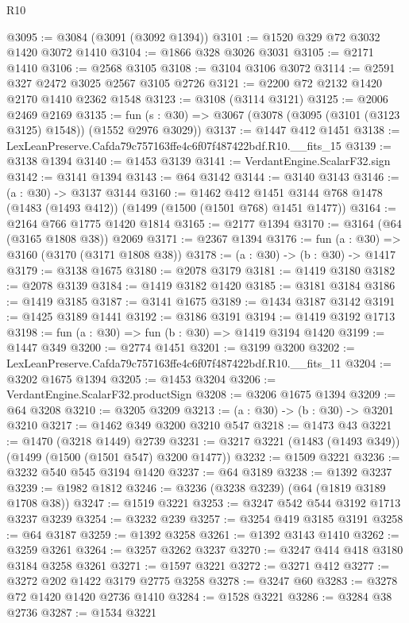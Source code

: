 \begin{lexlean}{R10}
\begin{coremodule}
@3095 := @3084 (@3091 (@3092 @1394))
@3101 := @1520 @329 @72 @3032 @1420 @3072 @1410
@3104 := @1866 @328 @3026 @3031
@3105 := @2171 @1410
@3106 := @2568 @3105
@3108 := @3104 @3106 @3072
@3114 := @2591 @327 @2472 @3025 @2567 @3105 @2726
@3121 := @2200 @72 @2132 @1420 @2170 @1410 @2362 @1548
@3123 := @3108 (@3114 @3121)
@3125 := @2006 @2469 @2169
@3135 := fun (s : @30) => @3067 (@3078 (@3095 (@3101 (@3123 @3125) @1548)) (@1552 @2976 @3029))
@3137 := @1447 @412 @1451
@3138 := LexLeanPreserve.Cafda79c757163ffe4c6f07f487422bdf.R10.__fits_15
@3139 := @3138 @1394
@3140 := @1453 @3139
@3141 := VerdantEngine.ScalarF32.sign
@3142 := @3141 @1394
@3143 := @64 @3142
@3144 := @3140 @3143
@3146 := (a : @30) -> @3137 @3144
@3160 := @1462
    @412
    @1451
    @3144
    @768
    @1478
    (@1483 (@1493 @412))
    (@1499 (@1500 (@1501 @768) @1451 @1477))
@3164 := @2164 @766 @1775 @1420 @1814
@3165 := @2177 @1394
@3170 := @3164 (@64 (@3165 @1808 @38)) @2069
@3171 := @2367 @1394
@3176 := fun (a : @30) => @3160 (@3170 (@3171 @1808 @38))
@3178 := (a : @30) -> (b : @30) -> @1417
@3179 := @3138 @1675
@3180 := @2078 @3179
@3181 := @1419 @3180
@3182 := @2078 @3139
@3184 := @1419 @3182 @1420
@3185 := @3181 @3184
@3186 := @1419 @3185
@3187 := @3141 @1675
@3189 := @1434 @3187 @3142
@3191 := @1425 @3189 @1441
@3192 := @3186 @3191
@3194 := @1419 @3192 @1713
@3198 := fun (a : @30) => fun (b : @30) => @1419 @3194 @1420
@3199 := @1447 @349
@3200 := @2774 @1451
@3201 := @3199 @3200
@3202 := LexLeanPreserve.Cafda79c757163ffe4c6f07f487422bdf.R10.__fits_11
@3204 := @3202 @1675 @1394
@3205 := @1453 @3204
@3206 := VerdantEngine.ScalarF32.productSign
@3208 := @3206 @1675 @1394
@3209 := @64 @3208
@3210 := @3205 @3209
@3213 := (a : @30) -> (b : @30) -> @3201 @3210
@3217 := @1462 @349 @3200 @3210 @547
@3218 := @1473 @43
@3221 := @1470 (@3218 @1449) @2739
@3231 := @3217 @3221 (@1483 (@1493 @349)) (@1499 (@1500 (@1501 @547) @3200 @1477))
@3232 := @1509 @3221
@3236 := @3232 @540 @545 @3194 @1420
@3237 := @64 @3189
@3238 := @1392 @3237
@3239 := @1982 @1812
@3246 := @3236 (@3238 @3239) (@64 (@1819 @3189 @1708 @38))
@3247 := @1519 @3221
@3253 := @3247 @542 @544 @3192 @1713 @3237 @3239
@3254 := @3232 @239
@3257 := @3254 @419 @3185 @3191
@3258 := @64 @3187
@3259 := @1392 @3258
@3261 := @1392 @3143 @1410
@3262 := @3259 @3261
@3264 := @3257 @3262 @3237
@3270 := @3247 @414 @418 @3180 @3184 @3258 @3261
@3271 := @1597 @3221
@3272 := @3271 @412
@3277 := @3272 @202 @1422 @3179 @2775 @3258
@3278 := @3247 @60
@3283 := @3278 @72 @1420 @1420 @2736 @1410
@3284 := @1528 @3221
@3286 := @3284 @38 @2736
@3287 := @1534 @3221

\end{coremodule}
\end{lexlean}

